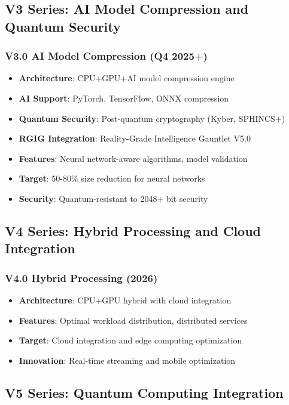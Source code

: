 \documentclass[12pt,a4paper]{article}
\begin{document}
\subsection{V3 Series: AI Model Compression and Quantum Security}
\subsubsection{V3.0 AI Model Compression (Q4 2025+)}
\begin{itemize}
    \item \textbf{Architecture}: CPU+GPU+AI model compression engine
    \item \textbf{AI Support}: PyTorch, TensorFlow, ONNX compression
    \item \textbf{Quantum Security}: Post-quantum cryptography (Kyber, SPHINCS+)
    \item \textbf{RGIG Integration}: Reality-Grade Intelligence Gauntlet V5.0
    \item \textbf{Features}: Neural network-aware algorithms, model validation
    \item \textbf{Target}: 50-80\% size reduction for neural networks
    \item \textbf{Security}: Quantum-resistant to 2048+ bit security
\end{itemize}

\subsection{V4 Series: Hybrid Processing and Cloud Integration}
\subsubsection{V4.0 Hybrid Processing (2026)}
\begin{itemize}
    \item \textbf{Architecture}: CPU+GPU hybrid with cloud integration
    \item \textbf{Features}: Optimal workload distribution, distributed services
    \item \textbf{Target}: Cloud integration and edge computing optimization
    \item \textbf{Innovation}: Real-time streaming and mobile optimization
\end{itemize}

\subsection{V5 Series: Quantum Computing Integration}
\end{document}

